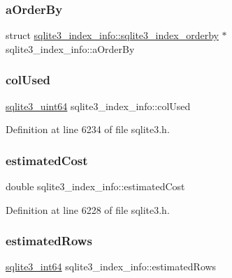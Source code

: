 \subsubsection{\texorpdfstring{a\+Order\+By}{aOrderBy}}
{\footnotesize\ttfamily struct \mbox{\hyperlink{structsqlite3__index__info_1_1sqlite3__index__orderby}{sqlite3\+\_\+index\+\_\+info\+::sqlite3\+\_\+index\+\_\+orderby}} $\ast$ sqlite3\+\_\+index\+\_\+info\+::a\+Order\+By}

\mbox{\label{structsqlite3__index__info_a99787169e2f78c0728bdb339c4107a2e}} 
\subsubsection{\texorpdfstring{col\+Used}{colUsed}}
{\footnotesize\ttfamily \mbox{\hyperlink{sqlite3_8h_a181c20ecfd72bc6627635746d382c610}{sqlite3\+\_\+uint64}} sqlite3\+\_\+index\+\_\+info\+::col\+Used}



Definition at line 6234 of file sqlite3.\+h.

\mbox{\label{structsqlite3__index__info_aa8b4fe1d2ee38aab57ba5e1da00d7830}} 
\subsubsection{\texorpdfstring{estimated\+Cost}{estimatedCost}}
{\footnotesize\ttfamily double sqlite3\+\_\+index\+\_\+info\+::estimated\+Cost}



Definition at line 6228 of file sqlite3.\+h.

\mbox{\label{structsqlite3__index__info_adcdf25dcf9848a6fedf539bb9c921b7f}} 
\subsubsection{\texorpdfstring{estimated\+Rows}{estimatedRows}}
{\footnotesize\ttfamily \mbox{\hyperlink{sqlite3_8h_a0a4d3e6c1ad46f90e746b920ab6ca0d2}{sqlite3\+\_\+int64}} sqlite3\+\_\+index\+\_\+info\+::estimated\+Rows}



